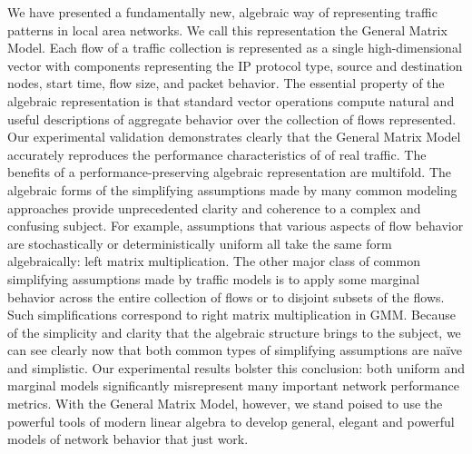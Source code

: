 \documentclass[twocolumn,final]{svjour3}
\newcommand{\caps}[1]{{\small{#1}}}
\begin{document}
We have presented a fundamentally new, algebraic way of representing traffic patterns in local area networks. We call this representation the General Matrix Model. Each flow of a traffic collection is represented as a single high-dimensional vector with components representing the \caps{IP} protocol type, source and destination nodes, start time, flow size, and packet behavior. The essential property of the algebraic representation is that standard vector operations compute natural and useful descriptions of aggregate behavior over the collection of flows represented. Our experimental validation demonstrates clearly that the General Matrix Model accurately reproduces the performance characteristics of of real traffic. The benefits of a performance-preserving algebraic representation are multifold. The algebraic forms of the simplifying assumptions made by many common modeling approaches provide unprecedented clarity and coherence to a complex and confusing subject. For example, assumptions that various aspects of flow behavior are stochastically or deterministically uniform all take the same form algebraically: left matrix multiplication. The other major class of common simplifying assumptions made by traffic models is to apply some marginal behavior across the entire collection of flows or to disjoint subsets of the flows. Such simplifications correspond to right matrix multiplication in \caps{GMM}. Because of the simplicity and clarity that the algebraic structure brings to the subject, we can see clearly now that both common types of simplifying assumptions are na\"ive and simplistic. Our experimental results bolster this conclusion: both uniform and marginal models significantly misrepresent many important network performance metrics. With the General Matrix Model, however, we stand poised to use the powerful tools of modern linear algebra to develop general, elegant and powerful models of network behavior that just work.
\end{document}
